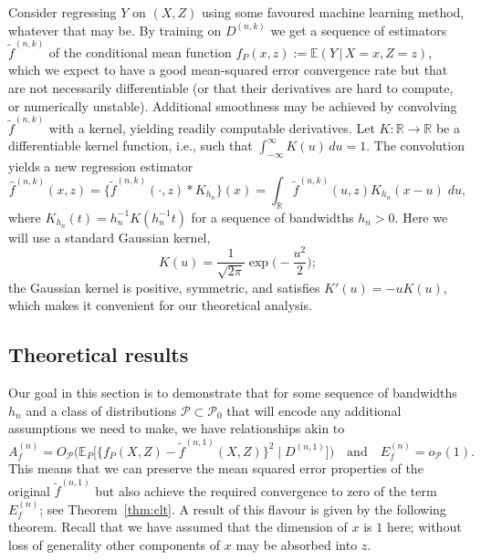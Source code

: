 \documentclass[aos]{imsart}
\newcommand{\R}{\mathbb{R}}
\newcommand{\E}{\mathbb{E}}
\newcommand{\given}{\,|\,}
\begin{document}
	Consider regressing $Y$ on $(X,Z)$ using some favoured machine learning method, whatever that may be. By training on $D^{(n,k)}$ we get a sequence of estimators $\tilde f^{(n,k)}$ of the conditional mean function $f_P(x,z):=\E(Y\given  X=x, Z=z)$, which we expect to have a good mean-squared error convergence rate but that are not necessarily differentiable (or that their derivatives are hard to compute, or numerically unstable). Additional smoothness may be achieved by convolving $\tilde f^{(n,k)}$ with a kernel, yielding readily computable derivatives. Let $K:\R\to\R$ be a differentiable kernel function, i.e., such that $\int_{-\infty}^{\infty} K(u)\, du=1$. The convolution yields a new regression estimator
	\begin{equation*}
		\hat f^{(n,k)}(x,z) = \{\tilde f^{(n,k)}(\cdot, z)*K_{h_n}\}(x) = \int_{\R} \tilde f^{(n,k)}(u,z) K_{h_n}(x-u) \; du,
	\end{equation*}
	where $K_{h_n}(t)=h_n^{-1} K(h_n^{-1}t)$ for a sequence of bandwidths $h_n>0$. Here we will use a standard Gaussian kernel,\begin{equation*}
		K(u)=\frac1{\sqrt{2\pi}} \exp\bigg(-\frac{u^2}{2}\bigg);
	\end{equation*}
	the Gaussian kernel is positive, symmetric, and satisfies $ K'(u) = -u K(u)$, which makes it convenient for our theoretical analysis.
	
	\subsection{Theoretical results}
	Our goal in this section is to demonstrate that for some sequence of bandwidths $h_n$ and a class of distributions 
	 $\mathcal{P}\subset \mathcal{P}_0$ that will encode any additional assumptions we need to make, we have relationships akin to 
	  \begin{equation}
		A_f^{(n)} = O_{\mathcal{P}}\Big(\E_P\Big[\big\{f_P(X,Z)-\tilde f^{(n,1)}(X,Z)\big\}^2 \;\Big| \; D^{(n,1)}\Big]\Big) \quad \text{and} \quad E_f^{(n)} = o_{\mathcal{P}}(1). \label{eqn:hratetarget}
	\end{equation}
This means that we can preserve the mean squared error properties of the original $\tilde{f}^{(n,1)}$ but also achieve the required convergence to zero of the term $E_f^{(n)}$; see Theorem~\ref{thm:clt}. A result of this flavour is given by the following theorem. Recall that we have assumed that the dimension of $x$ is $1$ here; without loss of generality other components of $x$ may be absorbed into $z$.
	
\end{document}
